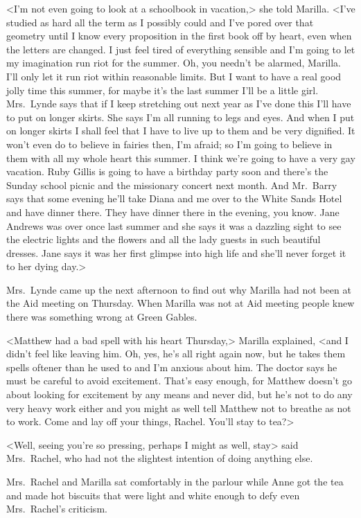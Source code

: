 <I'm not even going to look at a schoolbook in vacation,> she told Marilla. <I've studied as hard all the term as I possibly could and I've pored over that geometry until I know every proposition in the first book off by heart, even when the letters are changed. I just feel tired of everything sensible and I'm going to let my imagination run riot for the summer. Oh, you needn't be alarmed, Marilla. I'll only let it run riot within reasonable limits. But I want to have a real good jolly time this summer, for maybe it's the last summer I'll be a little girl. Mrs.~Lynde says that if I keep stretching out next year as I've done this I'll have to put on longer skirts. She says I'm all running to legs and eyes. And when I put on longer skirts I shall feel that I have to live up to them and be very dignified. It won't even do to believe in fairies then, I'm afraid; so I'm going to believe in them with all my whole heart this summer. I think we're going to have a very gay vacation. Ruby Gillis is going to have a birthday party soon and there's the Sunday school picnic and the missionary concert next month. And Mr.~Barry says that some evening he'll take Diana and me over to the White Sands Hotel and have dinner there. They have dinner there in the evening, you know. Jane Andrews was over once last summer and she says it was a dazzling sight to see the electric lights and the flowers and all the lady guests in such beautiful dresses. Jane says it was her first glimpse into high life and she'll never forget it to her dying day.>

Mrs.~Lynde came up the next afternoon to find out why Marilla had not been at the Aid meeting on Thursday. When Marilla was not at Aid meeting people knew there was something wrong at Green Gables.

<Matthew had a bad spell with his heart Thursday,> Marilla explained, <and I didn't feel like leaving him. Oh, yes, he's all right again now, but he takes them spells oftener than he used to and I'm anxious about him. The doctor says he must be careful to avoid excitement. That's easy enough, for Matthew doesn't go about looking for excitement by any means and never did, but he's not to do any very heavy work either and you might as well tell Matthew not to breathe as not to work. Come and lay off your things, Rachel. You'll stay to tea?>

<Well, seeing you're so pressing, perhaps I might as well, stay> said Mrs.~Rachel, who had not the slightest intention of doing anything else.

Mrs.~Rachel and Marilla sat comfortably in the parlour while Anne got the tea and made hot biscuits that were light and white enough to defy even Mrs.~Rachel's criticism.


